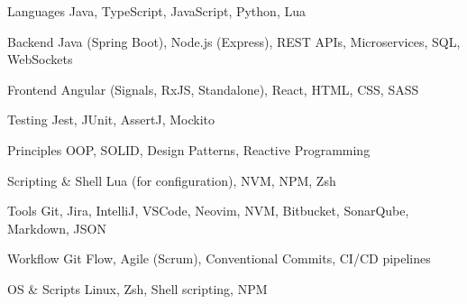 
\begin{cvskills}

  \cvskill
    {Languages} %
    {Java, TypeScript, JavaScript, Python, Lua} %

  \cvskill
    {Backend} %
    {Java (Spring Boot), Node.js (Express), REST APIs, Microservices, SQL, WebSockets} %

  \cvskill
    {Frontend} %
    {Angular (Signals, RxJS, Standalone), React, HTML, CSS, SASS} %

  \cvskill
    {Testing} %
    {Jest, JUnit, AssertJ, Mockito} %

  \cvskill
    {Principles} %
    {OOP, SOLID, Design Patterns, Reactive Programming} %

  \cvskill
    {Scripting \& Shell} %
    {Lua (for configuration), NVM, NPM, Zsh} %

\cvskill
    {Tools} %
    {Git, Jira, IntelliJ, VSCode, Neovim, NVM, Bitbucket, SonarQube, Markdown, JSON} %

  \cvskill
    {Workflow} %
    {Git Flow, Agile (Scrum), Conventional Commits, CI/CD pipelines} %

  \cvskill
    {OS \& Scripts} %
    {Linux, Zsh, Shell scripting, NPM} %

\end{cvskills}
